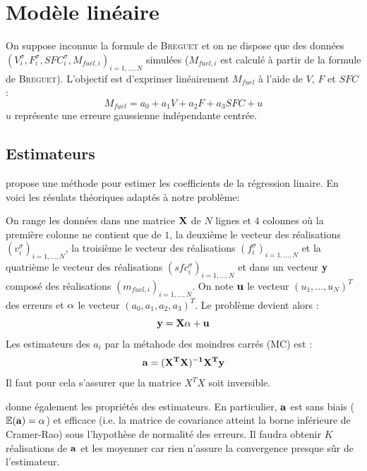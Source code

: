 \documentclass{article}
\begin{document}
\section{Modèle linéaire}
On suppose inconnue la formule de \textsc{Breguet} et on ne dispose que des données $(V_{i}^{\sigma},F_{i}^{\sigma},SFC_{i}^{\sigma}, M_{fuel,i})_{i=1,...,N}$ simulées ($M_{fuel,i}$ est calculé à partir de la formule de \textsc{Breguet}). L'objectif est d'exprimer linéairement $M_{fuel}$ à l'aide de $V$, $F$ et $SFC$ :
\[M_{fuel}=a_{0}+a_{1}V+a_{2}F+a_{3}SFC+u\] $u$ représente une erreure gaussienne indépendante centrée.
\subsection{Estimateurs}
\cite{ref1} propose une méthode pour estimer les coefficients de la régression linaire. En voici les résulats théoriques adaptés à notre problème:

On range les données dans une matrice $\bf{X}$ de $N$ lignes et $4$ colonnes où la première colonne ne contient que de $1$, la deuxième le vecteur des réalisations $(v_{i}^{\sigma})_{i=1,...,N}$, la troisième le vecteur des réalisations $(f_{i}^{\sigma})_{i=1,...,N}$ et la quatrième le vecteur des réalisations $(sfc_{i}^{\sigma})_{i=1,...,N}$ et dans un vecteur $\bf{y}$ composé des réalisations $(m_{fuel,i})_{i=1,...,N}$. On note $\bf{u}$ le vecteur $(u_{1},...,u_{N})^{T}$ des erreurs et $\bf\alpha$ le vecteur $(a_{0},a_{1},a_{2},a_{3})^{T}$. Le problème devient alors :
\[\bf{y}=\bf{X}\bf\alpha+\bf{u}\]
Les estimateurs des $a_{i}$ par la métahode des moindres carrés (MC) est :
\[\bf a=(X^{T}X)^{-1}X^{T}y\]
Il faut pour cela s'assurer que la matrice $X^{T}X$ soit inversible. 

\cite{ref1} donne également les propriétés des estimateurs. En particulier, $\bf a$ est sans biais ($\mathbb{E}(\bf{a})=\alpha$) et efficace (i.e. la matrice de covariance atteint la borne inférieure de Cramer-Rao) sous l'hypothèse de normalité des erreurs. Il faudra obtenir $K$ réalisations de $\bf a$ et les moyenner car rien n'assure la convergence presque sûr de l'estimateur.
\end{document}
